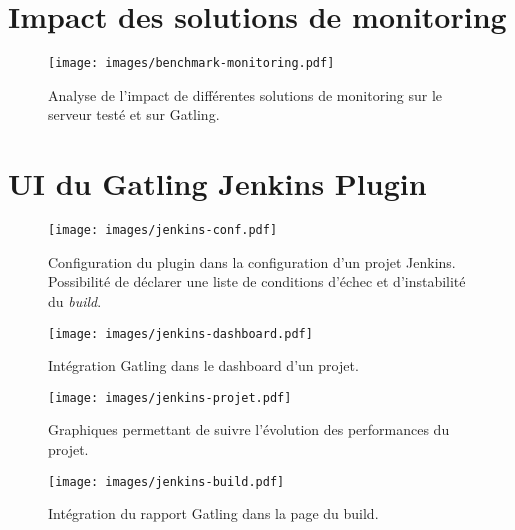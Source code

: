 \chapter{Impact des solutions de monitoring}
\label{ann:benchmark}
\begin{figure}[h!]
	\centering
		\texttt{[image: images/benchmark-monitoring.pdf]}
	\caption{Analyse de l'impact de différentes solutions de monitoring sur le serveur testé et sur Gatling.}
\end{figure}

\chapter{UI du Gatling Jenkins Plugin}
\label{ann:jenkins}
\begin{figure}[h!]
	\centering
		\texttt{[image: images/jenkins-conf.pdf]}
	\caption{Configuration du plugin dans la configuration d'un projet Jenkins. Possibilité de déclarer une liste de conditions d'échec et d'instabilité du \textit{build}.}
\end{figure}

\begin{figure}[h!]
	\centering
		\texttt{[image: images/jenkins-dashboard.pdf]}
	\caption{Intégration Gatling dans le dashboard d'un projet.}
\end{figure}

\begin{figure}[h!]
	\centering
		\texttt{[image: images/jenkins-projet.pdf]}
	\caption{Graphiques permettant de suivre l'évolution des performances du projet.}
\end{figure}

\begin{figure}[h!]
	\centering
		\texttt{[image: images/jenkins-build.pdf]}
	\caption{Intégration du rapport Gatling dans la page du build.}
\end{figure}
